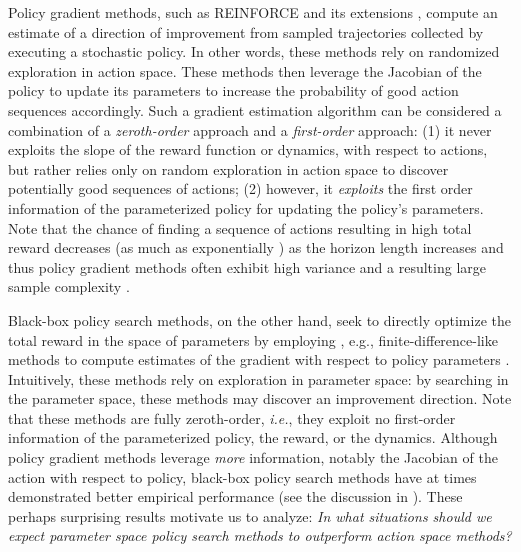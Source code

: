 Policy gradient methods, such as REINFORCE \citep{williams1992simple}
and its extensions \citep{kakade2002natural,bagnell2004policy, silver2014deterministic,schulman2015trust},
compute an estimate of a direction of improvement from sampled
trajectories collected by executing a stochastic policy. In other words, these methods rely on
randomized exploration in action space. These methods then leverage
the Jacobian of the policy to update its parameters to increase the
probability of good action sequences accordingly. Such a gradient
estimation algorithm can be considered a combination of a
\textit{zeroth-order} approach and a \textit{first-order} approach:
(1) it never exploits the slope of the reward function or dynamics,
with respect to actions, but rather relies only on random exploration
in action space to discover potentially good sequences of actions; (2)
however, it \emph{exploits} the first order information of the
parameterized policy for updating the policy's parameters. Note that
the chance of finding a sequence of actions resulting in high total
reward decreases (as much as exponentially
\citep{kakade2002approximately}) as the horizon length increases and
thus policy gradient methods often exhibit high variance and a
resulting large sample complexity \citep{peters2008reinforcement,
  zhao2011analysis}.

Black-box policy search methods, on the other hand, seek to directly
optimize the total reward in the space of parameters by employing
, e.g., finite-difference-like methods to compute estimates of the
gradient with respect to policy parameters
\citep{bagnell2001autonomous,mannor2003cross,heidrich2008evolution,tesch2011using,sehnke2010parameter,salimans2017evolution,mania2018simple}.  
Intuitively, these methods rely on exploration in parameter space: by
searching in the parameter space, these methods may discover an
improvement direction. Note that these methods are fully zeroth-order,
\textit{i.e.}, they exploit no first-order information of the
parameterized policy, the reward, or the dynamics.  Although policy gradient methods leverage \textit{more} information,
notably the Jacobian of the action with respect to policy, black-box policy search methods have
at times demonstrated better empirical performance (see the discussion in 
\citep{kober2013reinforcement, mania2018simple}). These perhaps surprising results motivate us to analyze:
\textit{In
  what situations should we expect parameter space policy search methods
  to outperform action space methods?}

